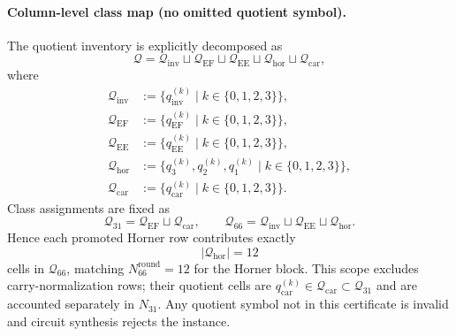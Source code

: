 ﻿\documentclass[11pt]{article}
\begin{document}
\paragraph{Column-level class map (no omitted quotient symbol).}
The quotient inventory is explicitly decomposed as
\[
\mathcal Q
=
\mathcal Q_{\mathrm{inv}}
\sqcup
\mathcal Q_{\mathrm{EF}}
\sqcup
\mathcal Q_{\mathrm{EE}}
\sqcup
\mathcal Q_{\mathrm{hor}}
\sqcup
\mathcal Q_{\mathrm{car}},
\]
where
\begin{align*}
\mathcal Q_{\mathrm{inv}}
&:=
\{q_{\mathrm{inv}}^{(k)} \mid k\in\{0,1,2,3\}\},
\\
\mathcal Q_{\mathrm{EF}}
&:=
\{q_{\mathrm{EF}}^{(k)} \mid k\in\{0,1,2,3\}\},
\\
\mathcal Q_{\mathrm{EE}}
&:=
\{q_{\mathrm{EE}}^{(k)} \mid k\in\{0,1,2,3\}\},
\\
\mathcal Q_{\mathrm{hor}}
&:=
\{q_3^{(k)},q_2^{(k)},q_1^{(k)} \mid k\in\{0,1,2,3\}\},
\\
\mathcal Q_{\mathrm{car}}
&:=
\{q_{\mathrm{car}}^{(k)} \mid k\in\{0,1,2,3\}\}.
\end{align*}
Class assignments are fixed as
\[
\mathcal Q_{31}=\mathcal Q_{\mathrm{EF}}\sqcup\mathcal Q_{\mathrm{car}},
\qquad
\mathcal Q_{66}=\mathcal Q_{\mathrm{inv}}\sqcup\mathcal Q_{\mathrm{EE}}\sqcup\mathcal Q_{\mathrm{hor}}.
\]
Hence each promoted Horner row contributes exactly
\[
|\mathcal Q_{\mathrm{hor}}| = 12
\]
cells in \(\mathcal Q_{66}\), matching \(N_{66}^{\mathrm{round}}=12\) for the
Horner block. This scope excludes carry-normalization rows; their quotient
cells are \(q_{\mathrm{car}}^{(k)}\in\mathcal Q_{\mathrm{car}}\subset\mathcal Q_{31}\)
and are accounted separately in \(N_{31}\).
Any quotient symbol not in this certificate is invalid and circuit synthesis
rejects the instance.
\end{document}
